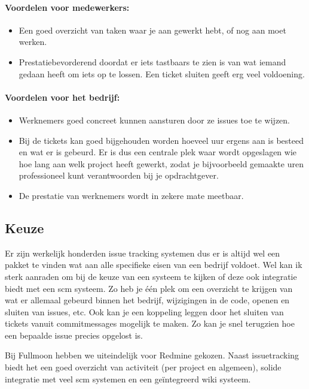 \paragraph{Voordelen voor medewerkers:}

\begin{itemize}
  \item Een goed overzicht van taken waar je aan gewerkt hebt, of nog aan moet werken.
  \item Prestatiebevorderend doordat er iets tastbaars te zien is van wat iemand gedaan heeft om iets op te lossen. Een ticket sluiten geeft erg veel voldoening.
\end{itemize}

\paragraph{Voordelen voor het bedrijf:}

\begin{itemize}
  \item Werknemers goed concreet kunnen aansturen door ze issues toe te wijzen.
  \item Bij de tickets kan goed bijgehouden worden hoeveel uur ergens aan is besteed en wat er is gebeurd. Er is dus een centrale plek waar wordt opgeslagen wie hoe lang aan welk project heeft gewerkt, zodat je bijvoorbeeld gemaakte uren professioneel kunt verantwoorden bij je opdrachtgever.
  \item De prestatie van werknemers wordt in zekere mate meetbaar.
\end{itemize}

\subsection{Keuze}

Er zijn werkelijk honderden issue tracking systemen\cite{issuetracking} dus er is altijd wel een pakket te vinden wat aan alle specifieke eisen van een bedrijf voldoet. Wel kan ik sterk aanraden om bij de keuze van een systeem te kijken of deze ook integratie biedt met een {\sc scm} systeem. Zo heb je één plek om een overzicht te krijgen van wat er allemaal gebeurd binnen het bedrijf, wijzigingen in de code, openen en sluiten van issues, etc. Ook kan je een koppeling leggen door het sluiten van tickets vanuit commitmessages mogelijk te maken. Zo kan je snel terugzien hoe een bepaalde issue precies opgelost is.

Bij Fullmoon hebben we uiteindelijk voor Redmine\cite{redmine} gekozen. Naast issuetracking biedt het een goed overzicht van activiteit (per project en algemeen), solide integratie met veel {\sc scm} systemen en een geïntegreerd wiki systeem.

